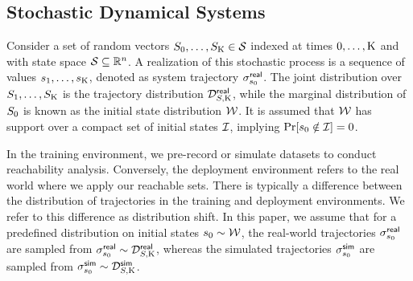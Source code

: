 \subsection{Stochastic Dynamical Systems} 
\vspace{-2mm}
Consider a set of random vectors $S_0, \ldots, S_{\mathrm{K}} \in \mathcal{S}$ indexed at times $0, \ldots, \mathrm{K}$ and with state space $\mathcal{S}\subseteq\mathbb{R}^n$. A realization of this stochastic process is a sequence of values $s_1, \ldots, s_{\mathrm{K}}$, denoted as system trajectory  $\sigma^{\mathsf{real}}_{s_0}$. The joint distribution over $S_1, \ldots, S_{\mathrm{K}}$ is the trajectory distribution $\mathcal{D}_{S,\mathrm{K}}^{\mathsf{real}}$, while the marginal distribution of $S_0$ is known as the initial state distribution $\mathcal{W}$. It is assumed that $\mathcal{W}$ has support over a compact set of initial states $\mathcal{I}$, implying $\Pr[s_0 \notin \mathcal{I}] = 0$.

 In the training environment, we pre-record or simulate datasets to conduct reachability analysis. Conversely, the deployment environment refers to the real world where we apply our reachable sets. There is typically a difference between the distribution of trajectories in the training and deployment environments. We refer to this difference as distribution shift. In this paper, we assume that for a predefined distribution on initial states $s_0 \sim \mathcal{W}$, the real-world trajectories $\sigma^{\mathsf{real}}_{s_0}$ are sampled from $\sigma^{\mathsf{real}}_{s_0} \sim \mathcal{D}_{S,\mathrm{K}}^{\mathsf{real}}$, whereas the simulated trajectories $\sigma^{\mathsf{sim}}_{s_0}$ are sampled from $\sigma^{\mathsf{sim}}_{s_0} \sim \mathcal{D}_{S,\mathrm{K}}^{\mathsf{sim}}$. 

\vspace{-2mm}
